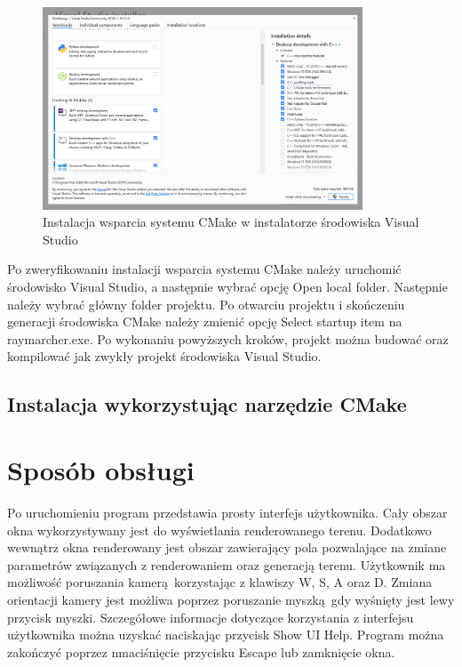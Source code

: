 \begin{figure}
\centering
\includegraphics[width=0.85\textwidth]{./graf/vscmakeinstall.png}
\caption{Instalacja wsparcia systemu CMake w instalatorze środowiska Visual Studio}
\label{fig:vs-cmake-install}
\end{figure}

Po zweryfikowaniu instalacji wsparcia systemu CMake należy uruchomić środowisko Visual Studio, a następnie wybrać opcję Open local folder. Następnie należy wybrać główny folder projektu. Po otwarciu projektu i skończeniu generacji środowiska CMake należy zmienić opcję Select startup item na raymarcher.exe. Po wykonaniu powyższych kroków, projekt można budować oraz kompilować jak zwykły projekt środowiska Visual Studio.

\subsection{Instalacja wykorzystując narzędzie CMake}

\section{Sposób obsługi}
Po uruchomieniu program przedstawia prosty interfejs użytkownika. Cały
obszar okna wykorzystywany jest do wyświetlania renderowanego terenu.
Dodatkowo wewnątrz okna renderowany jest obszar zawierający pola
pozwalające na zmiane parametrów związanych z renderowaniem oraz generacją
terenu. Użytkownik ma możliwość poruszania kamerą korzystając z klawiszy W, S, A oraz D. Zmiana orientacji kamery jest możliwa poprzez poruszanie myszką gdy wyśnięty jest lewy przycisk myszki. Szczegółowe informacje dotyczące korzystania z interfejsu użytkownika można uzyskać naciskając przycisk Show UI Help. Program można zakończyć poprzez nmaciśnięcie przycisku Escape lub zamknięcie okna.

